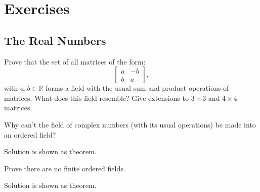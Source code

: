 \section{Exercises}

\subsection{The Real Numbers}

  \begin{exercise}
    Prove that the set of all matrices of the form:
    \begin{equation}
      \begin{bmatrix}
        a & -b \\
        b & a
      \end{bmatrix},
    \end{equation}
    with $a,b \in \mathbb{R}$ forms a field with the usual sum and product operations of
    matrices. What does this field resemble? Give extensions to $3 \times 3$ and
    $4 \times 4$ matrices.
  \end{exercise}
  \begin{solution}
    
  \end{solution}

  \begin{exercise}
    Why can't the field of complex numbers (with its usual operations) be
    made into an ordered field?
  \end{exercise}
  \begin{solution}
    Solution is shown as theorem. 
  \end{solution}

  \begin{exercise}
    Prove there are no finite ordered fields.
  \end{exercise}
  \begin{solution}
    Solution is shown as theorem. 
  \end{solution}

